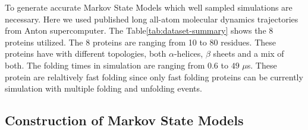 To generate accurate Markov State Models which well sampled simulations are necessary. Here we used published long all-atom molecular dynamics trajectories from Anton supercomputer\cite{lindorff2011}.
The Table\ref{tab:dataset-summary} shows the 8 proteins utilized. The 8 proteins are ranging  from 10 to 80 residues. These proteins have with different topologies, both $\alpha$-helices, $\beta$ sheets and a  mix of both. The folding times in simulation are ranging from $0.6$ to $49$ $\mu$s. These protein are relaltively fast folding since only fast folding proteins can be currently simulation with multiple folding and unfolding events.

\begin{table}[!ht]
\centering
\caption{Proteins for reference data}
\label{tab:dataset-summary}
\end{table}

\subsection{\label{sec:methods-msm}Construction of Markov State Models}

